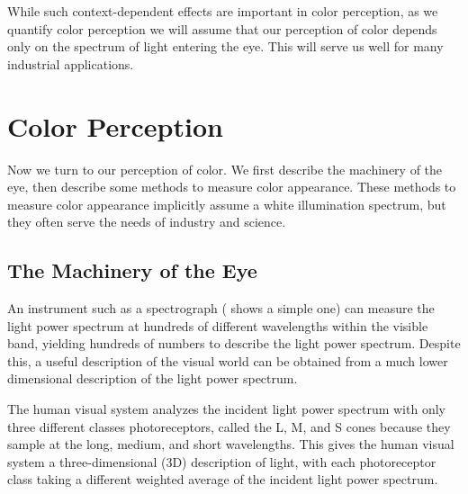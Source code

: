 
While such context-dependent effects are important in color perception, as we quantify color perception we will assume that our perception of color depends only on the spectrum of light entering the eye.  This will serve us well for many industrial applications.


\section{Color Perception}

Now we turn to our perception of color.  We first describe the
machinery of the eye, then describe some methods to measure color appearance.  These methods to measure color appearance implicitly assume a white illumination spectrum, but they often serve the needs of industry and science.


\subsection{The Machinery of the Eye}




An instrument such as a spectrograph (\fig{\ref{fig:colorWavelengths}} shows a simple one)
can measure the light power spectrum at hundreds of
different wavelengths within the visible band, yielding hundreds of
numbers to describe the light power spectrum.  Despite this, a useful
description of the visual world can be obtained from a much lower
dimensional description of the light power spectrum.  

The human visual
system analyzes the incident light power spectrum with only three
different classes photoreceptors, called the L, M, and S cones because
they sample at the long, medium, and short wavelengths.  This gives
the human visual system a three-dimensional (3D) description of light, with
each photoreceptor class taking a different weighted average of the
incident light power spectrum.

